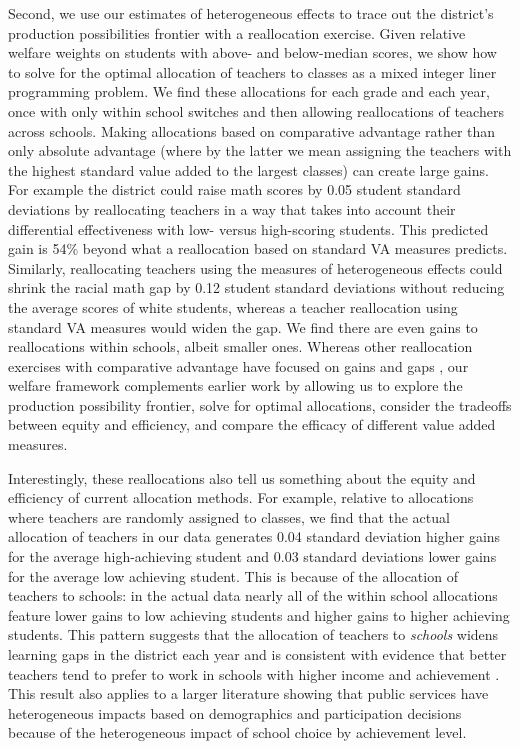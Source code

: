 \documentclass{article}
\theoremstyle{definition}
\theoremstyle{definition}
\theoremstyle{definition}
\theoremstyle{definition}
\begin{document}
    
Second, we use our estimates of heterogeneous effects to trace out the district’s production possibilities frontier with a reallocation exercise. Given relative welfare weights on students with above- and below-median scores, we show how to solve for the optimal allocation of teachers to classes as a mixed integer liner programming problem. We find these allocations for each grade and each year, once with only within school switches and then allowing reallocations of teachers across schools. Making allocations based on comparative advantage rather than only absolute advantage (where by the latter we mean assigning the teachers with the highest standard value added to the largest classes) can create large gains. For example the district could raise math scores by 0.05 student standard deviations by reallocating teachers in a way that takes into account their differential effectiveness with low- versus high-scoring students. This predicted gain is 54\% beyond what a reallocation based on standard VA measures predicts. Similarly, reallocating teachers using the measures of heterogeneous effects could shrink the racial math gap by 0.12 student standard deviations without reducing the average scores of white students, whereas a teacher reallocation using standard VA measures would widen the gap. We find there are even gains to reallocations within schools, albeit smaller ones. Whereas other reallocation exercises with comparative advantage have focused on gains and gaps \citep[e.g.,][]{Delgado2020}, our welfare framework complements earlier work by allowing us to explore the production possibility frontier, solve for optimal allocations,  consider the tradeoffs between equity and efficiency, and compare the efficacy of different value added measures.
    
 Interestingly, these reallocations also tell us something about the equity and efficiency of current allocation methods. For example, relative to allocations where teachers are randomly assigned to classes, we find that the actual allocation of teachers in our data generates 0.04 standard deviation higher gains for the average high-achieving student and 0.03 standard deviations lower gains for the average low achieving student. This is because of the allocation of teachers to schools: in the actual data nearly all of the within school allocations feature lower gains to low achieving students and higher gains to higher achieving students. This pattern suggests that the allocation of teachers to \textit{schools} widens learning gaps in the district each year and is consistent with evidence that better teachers tend to prefer to work in schools with higher income and achievement \citep{bates2022teacher}. This result also applies to a larger literature showing that public services have heterogeneous impacts based on demographics and participation decisions \citep{walters2018demand,finkelstein2019take,ito2021selection,ricks2022strategic} because of the heterogeneous impact of school choice by achievement level.
    
\end{document}
